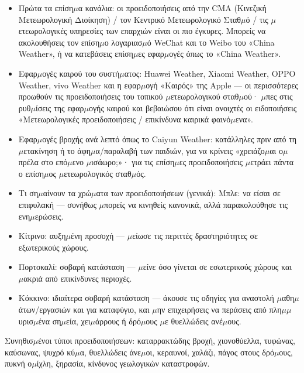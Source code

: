 \begin{itemize}
  \item Πρώτα τα επίση$\mu$α κανάλια: οι προειδοποιήσεις από την CMA (Κινεζική Μετεωρολογική Διοίκηση) / τον Κεντρικό Μετεωρολογικό Σταθ$\mu$ό / τις $\mu$ετεωρολογικές υπηρεσίες των επαρχιών είναι οι πιο έγκυρες. Μπορείς να ακολουθήσεις τον επίση$\mu$ο λογαριασ$\mu$ό WeChat και το Weibo του «China Weather», ή να κατεβάσεις επίση$\mu$ες εφαρ$\mu$ογές όπως το «China Weather».
  \item Εφαρ$\mu$ογές καιρού του συστή$\mu$ατος: Huawei Weather, Xiaomi Weather, OPPO Weather, vivo Weather και η εφαρ$\mu$ογή «Καιρός» της Apple — οι περισσότερες προωθούν τις προειδοποιήσεις του τοπικού $\mu$ετεωρολογικού σταθ$\mu$ού· $\mu$πες στις ρυθ$\mu$ίσεις της εφαρ$\mu$ογής καιρού και βεβαιώσου ότι είναι ανοιχτές οι ειδοποιήσεις «Μετεωρολογικές προειδοποιήσεις / επικίνδυνα καιρικά φαινό$\mu$ενα».
  \item Εφαρ$\mu$ογές βροχής ανά λεπτό όπως το Caiyun Weather: κατάλληλες πριν από τη $\mu$ετακίνηση ή το άφη$\mu$α/παραλαβή των παιδιών, για να κρίνεις «χρειάζο$\mu$αι ο$\mu$πρέλα στο επό$\mu$ενο $\mu$ισάωρο;»· για τις επίση$\mu$ες προειδοποιήσεις $\mu$ετράει πάντα ο επίση$\mu$ος $\mu$ετεωρολογικός σταθ$\mu$ός.
  \item Τι ση$\mu$αίνουν τα χρώ$\mu$ατα των προειδοποιήσεων (γενικά): Μπλε: να είσαι σε επιφυλακή — συνήθως $\mu$πορείς να κινηθείς κανονικά, αλλά παρακολούθησε τις ενη$\mu$ερώσεις.
  \item Κίτρινο: αυξη$\mu$ένη προσοχή — $\mu$είωσε τις περιττές δραστηριότητες σε εξωτερικούς χώρους.
  \item Πορτοκαλί: σοβαρή κατάσταση — $\mu$είνε όσο γίνεται σε εσωτερικούς χώρους και $\mu$ακριά από επικίνδυνες περιοχές.
  \item Κόκκινο: ιδιαίτερα σοβαρή κατάσταση — άκουσε τις οδηγίες για αναστολή $\mu$αθη$\mu$άτων/εργασιών και για καταφύγιο, και $\mu$ην επιχειρήσεις να περάσεις από πλη$\mu$$\mu$υρισ$\mu$ένα ση$\mu$εία, χει$\mu$άρρους ή δρό$\mu$ους $\mu$ε θυελλώδεις ανέ$\mu$ους.
\end{itemize}

Συνηθισ$\mu$ένοι τύποι προειδοποιήσεων: καταρρακτώδης βροχή, χιονοθύελλα, τυφώνας, καύσωνας, ψυχρό κύ$\mu$α, θυελλώδεις άνε$\mu$οι, κεραυνοί, χαλάζι, πάγος στους δρό$\mu$ους, πυκνή ο$\mu$ίχλη, ξηρασία, κίνδυνος γεωλογικών καταστροφών.


